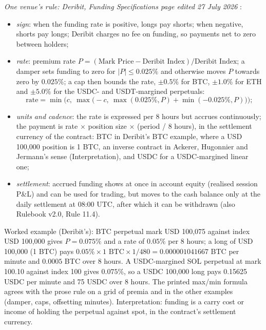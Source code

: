 \begin{qfmechanism}
 \emph{One venue's rule: Deribit, Funding Specifications page edited 27 July 2026} \citep[Funding Specifications]{gapclose-deribit-rules}:
\begin{itemize}
\item \emph{sign}: when the funding rate is positive, longs pay shorts; when negative, shorts pay longs; Deribit charges no fee on funding, so payments net to zero between holders;
\item \emph{rate}: premium rate $P=(\text{Mark Price}-\text{Deribit Index})/\text{Deribit Index}$; a damper sets funding to zero for $|P|\le0.025\%$ and otherwise moves $P$ towards zero by $0.025\%$; a cap then bounds the rate, $\pm0.5\%$ for BTC, $\pm1.0\%$ for ETH and $\pm5.0\%$ for the USDC- and USDT-margined perpetuals:
\[ \text{rate}=\min\bigl(c,\ \max\bigl(-c,\ \max(0.025\%,P)+\min(-0.025\%,P)\bigr)\bigr); \]
\item \emph{units and cadence}: the rate is expressed per 8 hours but accrues continuously; the payment is rate $\times$ position size $\times$ (period / 8 hours), in the settlement currency of the contract: BTC in Deribit's BTC example, where a USD 100{,}000 position is 1 BTC, an inverse contract in Ackerer, Hugonnier and Jermann's sense (Interpretation), and USDC for a USDC-margined linear one;
\item \emph{settlement}: accrued funding shows at once in account equity (realised session P\&L) and can be used for trading, but moves to the cash balance only at the daily settlement at 08:00 UTC, after which it can be withdrawn (also Rulebook v2.0, Rule 11.4).
\end{itemize}

 Worked example (Deribit's): BTC perpetual mark USD 100{,}075 against index USD 100{,}000 gives $P=0.075\%$ and a rate of $0.05\%$ per 8 hours; a long of USD 100{,}000 (1 BTC) pays $0.05\%\times1\text{ BTC}\times1/480=0.000001041667$ BTC per minute and $0.0005$ BTC over 8 hours. A USDC-margined SOL perpetual at mark 100.10 against index 100 gives $0.075\%$, so a USDC 100{,}000 long pays 0.15625 USDC per minute and 75 USDC over 8 hours. The printed max/min formula agrees with the prose rule on a grid of premia and in the other examples (damper, caps, offsetting minutes). Interpretation: funding is a carry cost or income of holding the perpetual against spot, in the contract's settlement currency.


\end{qfmechanism}
